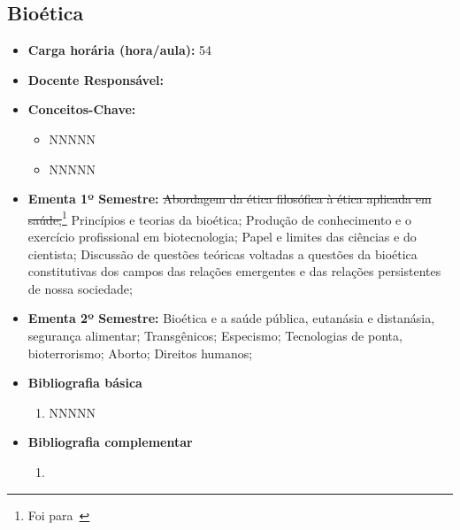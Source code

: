 \documentclass[11pt,fleqn]{book} %
\begin{document}
\subsection{Bioética}\label{disc:bioetica}
\begin{itemize}
	\item \textbf{Carga horária (hora/aula):} 54
	\item \textbf{Docente Responsável:}
	\item \textbf{Conceitos-Chave:}
	\begin{itemize}
		\item NNNNN
		\item NNNNN
	\end{itemize}
	\item \textbf{Ementa 1º Semestre:} 
	\sout{Abordagem da ética filosófica à ética aplicada em saúde;}\footnote{Foi para~}
	Princípios e teorias da bioética;
	Produção de conhecimento e o exercício profissional em biotecnologia; 
	Papel e limites das ciências e do cientista; 
	Discussão de questões teóricas voltadas a questões da bioética constitutivas dos campos das relações emergentes e das relações persistentes de nossa sociedade; 
	\item \textbf{Ementa 2º Semestre:} 
	Bioética e a saúde pública, eutanásia e distanásia, segurança alimentar; 
	Transgênicos; 
	Especismo; 
	Tecnologias de ponta, bioterrorismo; 
	Aborto;
	Direitos humanos;
	\item \textbf{Bibliografia básica}
	\begin{enumerate}
		\item NNNNN
	\end{enumerate}
	\item \textbf{Bibliografia complementar}
	\begin{enumerate}
		\item 
	\end{enumerate}	
\end{itemize}

\newpage
\end{document}
